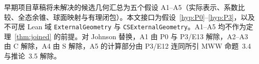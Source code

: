 \begin{remark}[较早假设登记表]\label{sec:retired-assumptions}
早期项目草稿将未解决的候选几何汇总为五个假设 A1--A5（实际表示、系数比较、全态余锥、球面映射与有理闭包）。本文接口为假设~\ref{hyp:P0}--\ref{hyp:P3}，以及不可居 Lean 域 \texttt{ExternalGeometry} 与 \texttt{CSExternalGeometry}。A1--A5 均不作为定理~\ref{thm:joined} 的前提。对 Johnson 替换，A1 由 P0 与 P3/E13 解除，A2--A3 由 C 解除，A4 由 S 解除，A5 的计算部分由 P3/E12 连同所引 MWW 命题~3.4 与推论~3.5 解除。
\end{remark}
